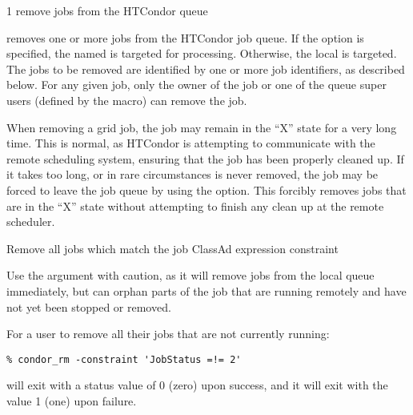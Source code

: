 \begin{ManPage}{\label{man-condor-rm}}{1}
{remove jobs from the HTCondor queue}

\Synopsis {}
\ToolArgsBase

\ToolDebugOption
{}
\ToolLocate
\ToolJobs
\Bar{}  \Dots

\ToolDebugOption
\ToolLocate
\ToolAll

\Description

 removes one or more jobs from the HTCondor job queue.  
If the  option is specified, the named  is targeted
for processing.  
Otherwise, the local  is targeted.
The jobs to be removed are identified by one or more job identifiers, as
described below.
For any given job, only the owner of the job or one of the queue super users
(defined by the  macro) can remove the job.

When removing a grid job, the job may remain in
the ``X'' state for a very long time. 
This is normal, as HTCondor is attempting to communicate with the
remote scheduling system, 
ensuring that the job has been properly cleaned up.
If it takes too long, or in rare circumstances is never removed,
the job may be forced to
leave the job queue by using the  option.
This forcibly removes jobs that are in the ``X'' state without attempting
to finish any clean up at the remote scheduler.

\begin{Options}
	\ToolArgsBaseDesc
	\ToolLocateDesc
        \ToolDebugDesc
	 {Remove all jobs which match
	                the job ClassAd expression constraint}
\end{Options}

\GenRem

Use the  argument with caution, as it will remove jobs
from the local queue immediately, but can orphan parts of the job
that are running remotely and have not yet been stopped or removed.

\Examples
For a user to remove all their jobs that are not currently running:
\footnotesize
\begin{verbatim}
% condor_rm -constraint 'JobStatus =!= 2'
\end{verbatim}
\normalsize

\ExitStatus

 will exit with a status value of 0 (zero) upon success,
and it will exit with the value 1 (one) upon failure.

\end{ManPage}
